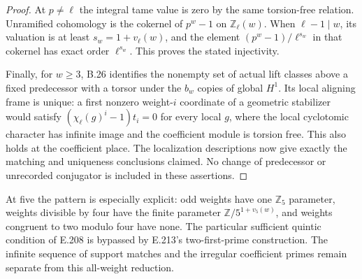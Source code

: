\begin{proof}
At $p\ne\ell$ the integral tame value is zero by the
same torsion-free relation. Unramified cohomology
is the cokernel of $p^w-1$ on $\mathbb Z_\ell(w)$.
When $\ell-1\mid w$, its valuation is at least
$s_w=1+v_\ell(w)$, and the element
$(p^w-1)/\ell^{s_w}$ in that cokernel has exact
order $\ell^{s_w}$. This proves the stated injectivity.

Finally, for $w\ge3$, B.26 identifies the nonempty set
of actual lift classes above a fixed predecessor with a torsor under the
$b_w$ copies of global $H^1$. Its local aligning
frame is unique: a first nonzero weight-$i$ coordinate
of a geometric stabilizer would satisfy
$(\chi_\ell(g)^i-1)t_i=0$ for every local $g$,
where the local cyclotomic character has infinite
image and the coefficient module is torsion free.
This also holds at the coefficient place.
The localization descriptions now give exactly the
matching and uniqueness conclusions claimed.
No change of predecessor or unrecorded conjugator
is included in these assertions.
\end{proof}

At five the pattern is especially explicit: odd
weights have one $\mathbb Z_5$ parameter, weights
divisible by four have the finite parameter
$\mathbb Z/5^{1+v_5(w)}$, and weights congruent to
two modulo four have none. The particular sufficient
quintic condition of E.208 is bypassed by E.213's
two-first-prime construction. The infinite sequence
of support matches and the irregular coefficient
primes remain separate from this all-weight reduction.
